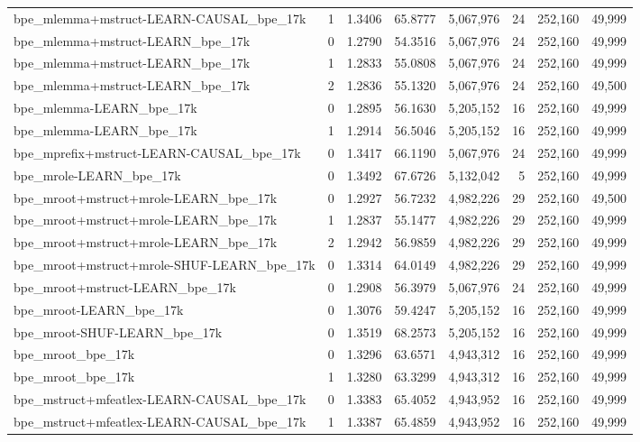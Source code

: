 \begin{tabular}{lrrrrrrr}
bpe\_mlemma+mstruct-LEARN-CAUSAL\_bpe\_17k & 1 & 1.3406 & 65.8777 & 5,067,976 & 24 & 252,160 & 49,999 \\
bpe\_mlemma+mstruct-LEARN\_bpe\_17k & 0 & 1.2790 & 54.3516 & 5,067,976 & 24 & 252,160 & 49,999 \\
bpe\_mlemma+mstruct-LEARN\_bpe\_17k & 1 & 1.2833 & 55.0808 & 5,067,976 & 24 & 252,160 & 49,999 \\
bpe\_mlemma+mstruct-LEARN\_bpe\_17k & 2 & 1.2836 & 55.1320 & 5,067,976 & 24 & 252,160 & 49,500 \\
bpe\_mlemma-LEARN\_bpe\_17k & 0 & 1.2895 & 56.1630 & 5,205,152 & 16 & 252,160 & 49,999 \\
bpe\_mlemma-LEARN\_bpe\_17k & 1 & 1.2914 & 56.5046 & 5,205,152 & 16 & 252,160 & 49,999 \\
bpe\_mprefix+mstruct-LEARN-CAUSAL\_bpe\_17k & 0 & 1.3417 & 66.1190 & 5,067,976 & 24 & 252,160 & 49,999 \\
bpe\_mrole-LEARN\_bpe\_17k & 0 & 1.3492 & 67.6726 & 5,132,042 & 5 & 252,160 & 49,999 \\
bpe\_mroot+mstruct+mrole-LEARN\_bpe\_17k & 0 & 1.2927 & 56.7232 & 4,982,226 & 29 & 252,160 & 49,500 \\
bpe\_mroot+mstruct+mrole-LEARN\_bpe\_17k & 1 & 1.2837 & 55.1477 & 4,982,226 & 29 & 252,160 & 49,999 \\
bpe\_mroot+mstruct+mrole-LEARN\_bpe\_17k & 2 & 1.2942 & 56.9859 & 4,982,226 & 29 & 252,160 & 49,999 \\
bpe\_mroot+mstruct+mrole-SHUF-LEARN\_bpe\_17k & 0 & 1.3314 & 64.0149 & 4,982,226 & 29 & 252,160 & 49,999 \\
bpe\_mroot+mstruct-LEARN\_bpe\_17k & 0 & 1.2908 & 56.3979 & 5,067,976 & 24 & 252,160 & 49,999 \\
bpe\_mroot-LEARN\_bpe\_17k & 0 & 1.3076 & 59.4247 & 5,205,152 & 16 & 252,160 & 49,999 \\
bpe\_mroot-SHUF-LEARN\_bpe\_17k & 0 & 1.3519 & 68.2573 & 5,205,152 & 16 & 252,160 & 49,999 \\
bpe\_mroot\_bpe\_17k & 0 & 1.3296 & 63.6571 & 4,943,312 & 16 & 252,160 & 49,999 \\
bpe\_mroot\_bpe\_17k & 1 & 1.3280 & 63.3299 & 4,943,312 & 16 & 252,160 & 49,999 \\
bpe\_mstruct+mfeatlex-LEARN-CAUSAL\_bpe\_17k & 0 & 1.3383 & 65.4052 & 4,943,952 & 16 & 252,160 & 49,999 \\
bpe\_mstruct+mfeatlex-LEARN-CAUSAL\_bpe\_17k & 1 & 1.3387 & 65.4859 & 4,943,952 & 16 & 252,160 & 49,999 \\

\end{tabular}
